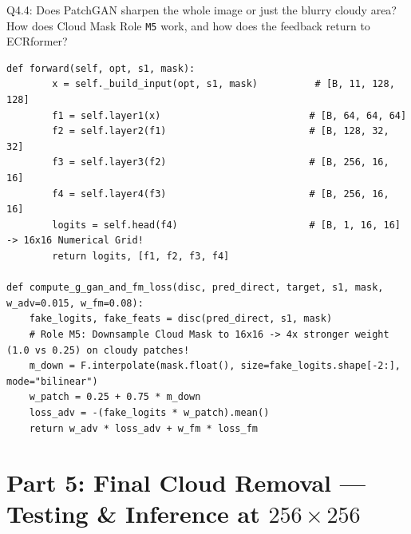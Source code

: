 \documentclass[11pt,a4paper]{article}
\begin{document}
\begin{qbox}{Q4.4: Does PatchGAN sharpen the whole image or just the blurry cloudy area? How does Cloud Mask Role \texttt{M5} work, and how does the feedback return to ECRformer?}
\begin{lstlisting}[caption={Conditional PatchGAN \& Cloud-Mask Weighted Loss Role M5 (from \texttt{backend/losses/patchgan\_loss.py})}]
    def forward(self, opt, s1, mask):
        x = self._build_input(opt, s1, mask)          # [B, 11, 128, 128]
        f1 = self.layer1(x)                          # [B, 64, 64, 64]
        f2 = self.layer2(f1)                         # [B, 128, 32, 32]
        f3 = self.layer3(f2)                         # [B, 256, 16, 16]
        f4 = self.layer4(f3)                         # [B, 256, 16, 16]
        logits = self.head(f4)                       # [B, 1, 16, 16] -> 16x16 Numerical Grid!
        return logits, [f1, f2, f3, f4]

def compute_g_gan_and_fm_loss(disc, pred_direct, target, s1, mask, w_adv=0.015, w_fm=0.08):
    fake_logits, fake_feats = disc(pred_direct, s1, mask)
    # Role M5: Downsample Cloud Mask to 16x16 -> 4x stronger weight (1.0 vs 0.25) on cloudy patches!
    m_down = F.interpolate(mask.float(), size=fake_logits.shape[-2:], mode="bilinear")
    w_patch = 0.25 + 0.75 * m_down
    loss_adv = -(fake_logits * w_patch).mean()
    return w_adv * loss_adv + w_fm * loss_fm
\end{lstlisting}
\end{qbox}

\newpage

\section{Part 5: Final Cloud Removal — Testing \& Inference at \texorpdfstring{$256\times 256$}{256x256}}
\end{document}
